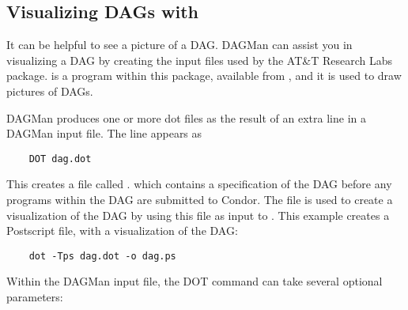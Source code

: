 \subsection{Visualizing DAGs with }

It can be helpful to see a picture of a DAG.
DAGMan can assist you in visualizing a DAG by creating
the input files used by the AT\&T Research Labs 
 package. 
 is a program within this package,
available from ,
and it is used to draw pictures of DAGs. 

DAGMan produces one or more dot files as the result of
an extra line
in a DAGMan input file. 
The line appears as
\begin{verbatim}
    DOT dag.dot
\end{verbatim}

This creates a file called .
which contains
a specification of the DAG before any programs within the DAG
are submitted to Condor.
The  file is used to create a visualization
of the DAG by using this file as input to .
This example creates a Postscript file, with a visualization of the DAG:

\begin{verbatim}
    dot -Tps dag.dot -o dag.ps
\end{verbatim}

Within the DAGMan input file,
the DOT command can take several optional parameters:

